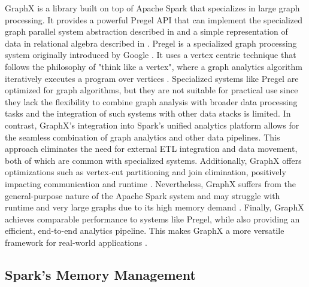 GraphX is a library built on top of Apache Spark that specializes in large graph processing. It provides a powerful Pregel API that can implement the specialized graph parallel system abstraction described in\cite{malewicz_pregel_2010} and a simple representation of data in relational algebra described in \cite{xin_graphx_2014}. Pregel is a specialized graph processing system originally introduced by Google \cite{malewicz_pregel_2010}. It uses a vertex centric technique that follows the philosophy of "think like a vertex", where a graph analytics algorithm iteratively executes a program over vertices \cite{xin_graphx_2014}. 
Specialized systems like Pregel are optimized for graph algorithms, but they are not suitable for practical use since they lack the flexibility to combine graph analysis with broader data processing tasks and the integration of such systems with other data stacks is limited. In contrast, GraphX's integration into Spark's unified analytics platform allows for the seamless combination of graph analytics and other data pipelines. This approach eliminates the need for external ETL integration and data movement, both of which are common with specialized systems. Additionally, GraphX offers optimizations such as vertex-cut partitioning and join elimination, positively impacting communication and runtime \cite{xin_graphx_2014}. Nevertheless, GraphX suffers from the general-purpose nature of the Apache Spark system and may struggle with runtime and very large graphs due to its high memory demand \cite{zhuo_distributed_2021}.  
Finally, GraphX achieves comparable performance to systems like Pregel, while also providing an efficient, end-to-end analytics pipeline. This makes GraphX a more versatile framework for real-world applications \cite{xin_graphx_2014}.

\subsection{Spark's Memory Management}


